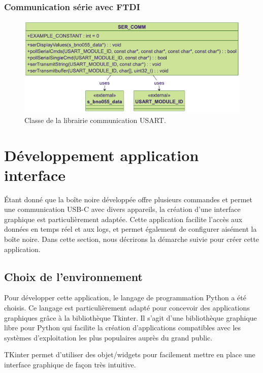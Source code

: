 \subsubsection{Communication série avec FTDI}

\begin{figure}[H]
	\centering
	\includegraphics[width=1\linewidth]{../figures/code/diagrammes/ser-com-class}
	\caption{Classe de la librairie communication USART.}
	\label{fig:ser-com-class}
\end{figure}

\clearpage

\section{Développement application interface}

Étant donné que la boîte noire développée offre plusieurs commandes et permet une communication USB-C avec divers appareils, la création d'une interface graphique est particulièrement adaptée. Cette application facilite l'accès aux données en temps réel et aux logs, et permet également de configurer aisément la boîte noire. Dans cette section, nous décrirons la démarche suivie pour créer cette application.

\subsection{Choix de l'environnement}

Pour développer cette application, le langage de programmation Python a été choisis. Ce langage est particulièrement adapté pour concevoir des applications graphiques grâce à la bibliothèque Tkinter. Il s'agit d'une bibliothèque graphique libre pour Python qui facilite la création d'applications compatibles avec les systèmes d'exploitation les plus populaires auprès du grand public.

TKinter permet d’utiliser des objet/widgets pour facilement mettre en place une interface graphique de façon très intuitive.

